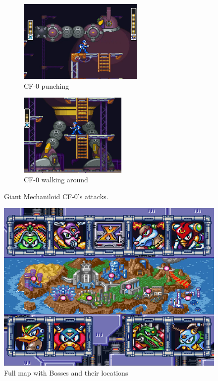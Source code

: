 \begin{figure}[htp]
	\centering
	\begin{subfigure}{0.5\linewidth}
		\centering
		\includegraphics[height=4cm]{figures/X2/cf_punch.jpg}
		\caption{CF-0 punching}
	\end{subfigure}
	\begin{subfigure}{0.4\linewidth}
		\centering
		\includegraphics[height=4cm]{figures/X2/cf_walk.jpg}
		\caption{CF-0 walking around}
	\end{subfigure}
	\caption{Giant Mechaniloid CF-0's attacks.}
\end{figure}

\begin{figure}[htp]
	\centering
	\includegraphics[width=0.5\linewidth]{figures/X2/map.png}
	\caption{Full map with Bosses and their locations}
\end{figure}


